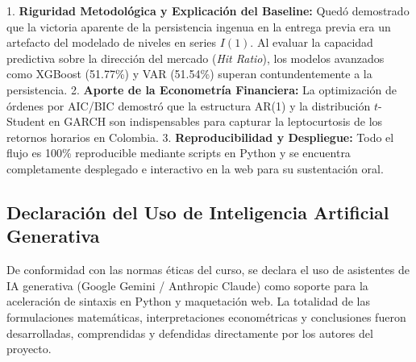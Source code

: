 \documentclass[12pt,letterpaper]{article}
\begin{document}
1. \textbf{Riguridad Metodológica y Explicación del Baseline:} Quedó demostrado que la victoria aparente de la persistencia ingenua en la entrega previa era un artefacto del modelado de niveles en series $I(1)$. Al evaluar la capacidad predictiva sobre la dirección del mercado (\textit{Hit Ratio}), los modelos avanzados como XGBoost (51.77\%) y VAR (51.54\%) superan contundentemente a la persistencia.
2. \textbf{Aporte de la Econometría Financiera:} La optimización de órdenes por AIC/BIC demostró que la estructura AR(1) y la distribución $t$-Student en GARCH son indispensables para capturar la leptocurtosis de los retornos horarios en Colombia.
3. \textbf{Reproducibilidad y Despliegue:} Todo el flujo es 100\% reproducible mediante scripts en Python y se encuentra completamente desplegado e interactivo en la web para su sustentación oral.

\subsection*{Declaración del Uso de Inteligencia Artificial Generativa}
De conformidad con las normas éticas del curso, se declara el uso de asistentes de IA generativa (Google Gemini / Anthropic Claude) como soporte para la aceleración de sintaxis en Python y maquetación web. La totalidad de las formulaciones matemáticas, interpretaciones econométricas y conclusiones fueron desarrolladas, comprendidas y defendidas directamente por los autores del proyecto.
\end{document}
